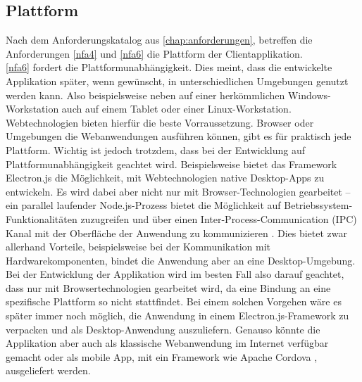 \subsection{Plattform}
\label{subs:plattform}

Nach dem Anforderungskatalog aus \autoref{chap:anforderungen}, betreffen die Anforderungen
\ref{nfa4} und \ref{nfa6} die Plattform der Clientapplikation.\\

\ref{nfa6} fordert die Plattformunabhängigkeit. Dies meint, dass die entwickelte
Applikation später, wenn gewünscht, in unterschiedlichen Umgebungen genutzt werden kann.
Also beispielsweise neben auf einer herkömmlichen Windows-Workstation auch auf einem
Tablet oder einer Linux-Workstation. Webtechnologien bieten hierfür die beste Vorraussetzung. 
Browser oder Umgebungen die Webanwendungen ausführen können, gibt es für praktisch 
jede Plattform. Wichtig ist jedoch trotzdem, dass bei der Entwicklung auf
Plattformunabhängigkeit geachtet wird. Beispielsweise bietet das Framework Electron.js die 
Möglichkeit, mit Webtechnologien native Desktop-Apps zu entwickeln. Es wird dabei aber nicht
nur mit Browser-Technologien gearbeitet -- ein parallel laufender Node.js-Prozess bietet
die Möglichkeit auf Betriebssystem-Funktionalitäten zuzugreifen 
und über einen Inter-Process-Communication (IPC) Kanal mit der Oberfläche der Anwendung zu
kommunizieren \cite{electron-architecture}. Dies bietet zwar allerhand Vorteile, 
beispielsweise bei der Kommunikation mit Hardwarekomponenten, bindet die Anwendung aber an eine Desktop-Umgebung. 
Bei der Entwicklung der Applikation wird im besten Fall also darauf geachtet, dass nur mit 
Browsertechnologien gearbeitet wird, da eine Bindung an eine spezifische Plattform so 
nicht stattfindet. Bei einem solchen Vorgehen wäre es später immer noch möglich, 
die Anwendung in einem Electron.js-Framework zu verpacken und als Desktop-Anwendung auszuliefern. 
Genauso könnte die Applikation aber auch als klassische Webanwendung im Internet verfügbar gemacht oder 
als mobile App, mit ein Framework wie Apache Cordova \cite{cordova}, ausgeliefert werden.\\

